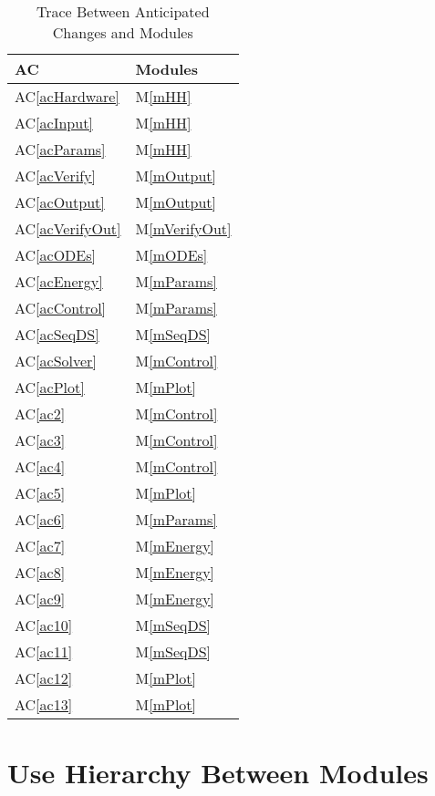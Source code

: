 \documentclass[12pt]{article}
\newcommand{\acref}[1]{AC\ref{#1}}
\newcommand{\mref}[1]{M\ref{#1}}
\begin{document}
\begin{table}[H]
\centering
\begin{tabular}{p{} p{}}
\toprule
\textbf{AC} & \textbf{Modules}\\
\midrule
\acref{acHardware} & \mref{mHH}\\
\acref{acInput} & \mref{mHH}\\ %
\acref{acParams} & \mref{mHH}\\
\acref{acVerify} & \mref{mOutput}\\ %
\acref{acOutput} & \mref{mOutput}\\
\acref{acVerifyOut} & \mref{mVerifyOut}\\
\acref{acODEs} & \mref{mODEs}\\
\acref{acEnergy} & \mref{mParams}\\
\acref{acControl} & \mref{mParams}\\
\acref{acSeqDS} & \mref{mSeqDS}\\
\acref{acSolver} & \mref{mControl}\\
\acref{acPlot} & \mref{mPlot}\\
\acref{ac2} & \mref{mControl}\\
\acref{ac3} & \mref{mControl}\\
\acref{ac4} & \mref{mControl}\\
\acref{ac5} & \mref{mPlot}\\
\acref{ac6} & \mref{mParams}\\
\acref{ac7} & \mref{mEnergy}\\
\acref{ac8} & \mref{mEnergy}\\
\acref{ac9} & \mref{mEnergy}\\
\acref{ac10} & \mref{mSeqDS}\\
\acref{ac11} & \mref{mSeqDS}\\
\acref{ac12} & \mref{mPlot}\\
\acref{ac13} & \mref{mPlot}\\

\bottomrule
\end{tabular}
\caption{Trace Between Anticipated Changes and Modules}
\label{TblACT}
\end{table}

\section{Use Hierarchy Between Modules} \label{SecUse}
\end{document}
